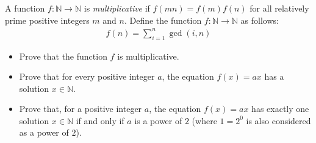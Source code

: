 \documentclass{subfile}
\begin{document}
%
%
%
%
%

	\begin{problem}
		A function $f:\mathbb{N}\to\mathbb{N}$ is \textit{multiplicative} if $f(mn)=f(m)f(n)$ for all relatively prime positive integers $m$ and $n$. Define the function $f: \mathbb{N}\to\mathbb{N}$ as follows:
			\begin{align*}
				f\left(n\right)=\sum_{i=1}^n\gcd\left(i, n\right)
			\end{align*}
		\begin{itemize}
			\item Prove that the function $f$ is multiplicative.
			\item Prove that for every positive integer $a$, the equation $f\left(x\right) = ax$ has a solution $x\in\mathbb{N}$.
			\item Prove that, for a positive integer $a$, the equation $f\left(x\right) = ax$ has exactly one solution $x\in\mathbb{N}$ if and only if $a$ is a power of $2$ (where $1=2^0$ is also considered as a power of $2$).
		\end{itemize}%
	\end{problem}
\end{document}
